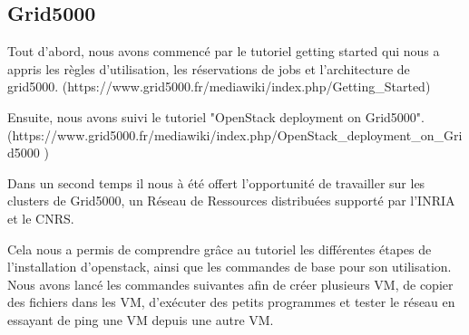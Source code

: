 \documentclass{report}
\begin{document}
        \subsection{Grid5000}
        
            Tout d'abord, nous avons commencé par le tutoriel getting started qui nous a appris les règles d'utilisation,  les réservations de jobs et l'architecture de grid5000.  (https://www.grid5000.fr/mediawiki/index.php/Getting_Started)
            
            Ensuite, nous avons suivi le tutoriel "OpenStack deployment on Grid5000".  (https://www.grid5000.fr/mediawiki/index.php/OpenStack_deployment_on_Grid5000 )
        
        
            Dans un second temps il nous à été offert l'opportunité de travailler sur les clusters
            de Grid5000, un Réseau de Ressources distribuées supporté par l'INRIA et le CNRS.\break
            
            Cela nous a permis de comprendre grâce au tutoriel
            les différentes étapes de l'installation d'openstack, ainsi que les commandes de base pour son utilisation.
            Nous avons lancé les commandes suivantes afin de créer plusieurs VM, de copier des fichiers dans les VM, d'exécuter des petits programmes et tester le réseau
            en essayant de ping une VM depuis une autre VM.
            
            
            
            
            
            
            
            
            
\end{document}
